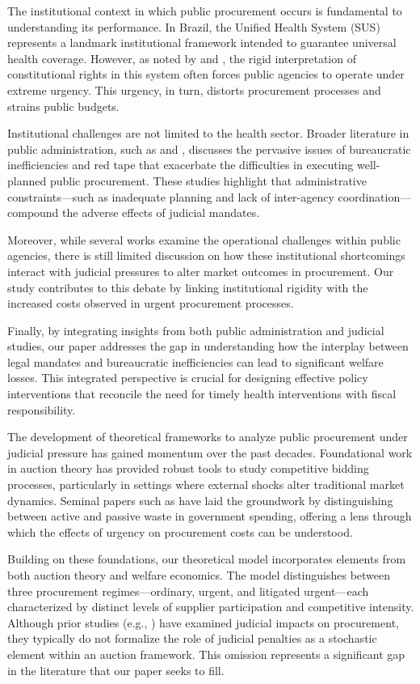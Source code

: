 The institutional context in which public procurement occurs is fundamental to understanding its performance. In Brazil, the Unified Health System (SUS) represents a landmark institutional framework intended to guarantee universal health coverage. However, as noted by \citet{castro2019} and \citet{soares2019}, the rigid interpretation of constitutional rights in this system often forces public agencies to operate under extreme urgency. This urgency, in turn, distorts procurement processes and strains public budgets.

Institutional challenges are not limited to the health sector. Broader literature in public administration, such as \citet{brewer2010impact} and \citet{basheka2011economic}, discusses the pervasive issues of bureaucratic inefficiencies and red tape that exacerbate the difficulties in executing well-planned public procurement. These studies highlight that administrative constraints—such as inadequate planning and lack of inter-agency coordination—compound the adverse effects of judicial mandates.

Moreover, while several works examine the operational challenges within public agencies, there is still limited discussion on how these institutional shortcomings interact with judicial pressures to alter market outcomes in procurement. Our study contributes to this debate by linking institutional rigidity with the increased costs observed in urgent procurement processes.

Finally, by integrating insights from both public administration and judicial studies, our paper addresses the gap in understanding how the interplay between legal mandates and bureaucratic inefficiencies can lead to significant welfare losses. This integrated perspective is crucial for designing effective policy interventions that reconcile the need for timely health interventions with fiscal responsibility.

The development of theoretical frameworks to analyze public procurement under judicial pressure has gained momentum over the past decades. Foundational work in auction theory has provided robust tools to study competitive bidding processes, particularly in settings where external shocks alter traditional market dynamics. Seminal papers such as \citet{bandiera2009active} have laid the groundwork by distinguishing between active and passive waste in government spending, offering a lens through which the effects of urgency on procurement costs can be understood.

Building on these foundations, our theoretical model incorporates elements from both auction theory and welfare economics. The model distinguishes between three procurement regimes—ordinary, urgent, and litigated urgent—each characterized by distinct levels of supplier participation and competitive intensity. Although prior studies (e.g., \citet{coviello2017court}) have examined judicial impacts on procurement, they typically do not formalize the role of judicial penalties as a stochastic element within an auction framework. This omission represents a significant gap in the literature that our paper seeks to fill.

